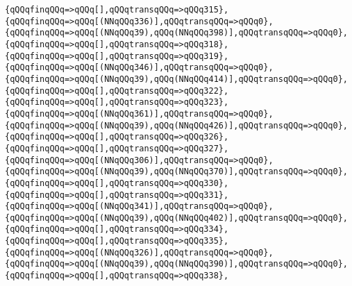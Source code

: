 \verb|{qQQqfinqQQq=>qQQq[],qQQqtransqQQq=>qQQq315},|\newline
\verb|{qQQqfinqQQq=>qQQq[(NNqQQq336)],qQQqtransqQQq=>qQQq0},|\newline
\verb|{qQQqfinqQQq=>qQQq[(NNqQQq39),qQQq(NNqQQq398)],qQQqtransqQQq=>qQQq0},|\newline
\verb|{qQQqfinqQQq=>qQQq[],qQQqtransqQQq=>qQQq318},|\newline
\verb|{qQQqfinqQQq=>qQQq[],qQQqtransqQQq=>qQQq319},|\newline
\verb|{qQQqfinqQQq=>qQQq[(NNqQQq346)],qQQqtransqQQq=>qQQq0},|\newline
\verb|{qQQqfinqQQq=>qQQq[(NNqQQq39),qQQq(NNqQQq414)],qQQqtransqQQq=>qQQq0},|\newline
\verb|{qQQqfinqQQq=>qQQq[],qQQqtransqQQq=>qQQq322},|\newline
\verb|{qQQqfinqQQq=>qQQq[],qQQqtransqQQq=>qQQq323},|\newline
\verb|{qQQqfinqQQq=>qQQq[(NNqQQq361)],qQQqtransqQQq=>qQQq0},|\newline
\verb|{qQQqfinqQQq=>qQQq[(NNqQQq39),qQQq(NNqQQq426)],qQQqtransqQQq=>qQQq0},|\newline
\verb|{qQQqfinqQQq=>qQQq[],qQQqtransqQQq=>qQQq326},|\newline
\verb|{qQQqfinqQQq=>qQQq[],qQQqtransqQQq=>qQQq327},|\newline
\verb|{qQQqfinqQQq=>qQQq[(NNqQQq306)],qQQqtransqQQq=>qQQq0},|\newline
\verb|{qQQqfinqQQq=>qQQq[(NNqQQq39),qQQq(NNqQQq370)],qQQqtransqQQq=>qQQq0},|\newline
\verb|{qQQqfinqQQq=>qQQq[],qQQqtransqQQq=>qQQq330},|\newline
\verb|{qQQqfinqQQq=>qQQq[],qQQqtransqQQq=>qQQq331},|\newline
\verb|{qQQqfinqQQq=>qQQq[(NNqQQq341)],qQQqtransqQQq=>qQQq0},|\newline
\verb|{qQQqfinqQQq=>qQQq[(NNqQQq39),qQQq(NNqQQq402)],qQQqtransqQQq=>qQQq0},|\newline
\verb|{qQQqfinqQQq=>qQQq[],qQQqtransqQQq=>qQQq334},|\newline
\verb|{qQQqfinqQQq=>qQQq[],qQQqtransqQQq=>qQQq335},|\newline
\verb|{qQQqfinqQQq=>qQQq[(NNqQQq326)],qQQqtransqQQq=>qQQq0},|\newline
\verb|{qQQqfinqQQq=>qQQq[(NNqQQq39),qQQq(NNqQQq390)],qQQqtransqQQq=>qQQq0},|\newline
\verb|{qQQqfinqQQq=>qQQq[],qQQqtransqQQq=>qQQq338},|\newline
